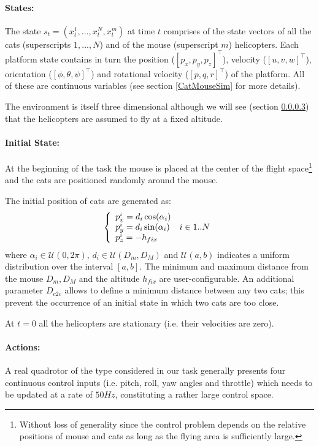 \documentclass[a4paper,11pt]{report}
\begin{document}
\paragraph{States:} The state $s_t = (x^1_t,...,x^{N}_t,x^m_t)$ at time $t$ comprises of the state vectors of all the cats (superscripts $1,...,N$) and of the mouse (superscript $m$) helicopters. 
Each platform state contains in turn the position ($[p_x,p_y,p_z]^\intercal$), velocity ($[u,v,w]^\intercal$), orientation ($[\phi,\theta,\psi]^\intercal$) and rotational velocity ($[p,q,r]^\intercal$) of the platform. All of these are continuous variables (see section \ref{CatMouseSim} for more details).

The environment is itself three dimensional although we will see (section \ref{catmouseactions}) that the helicopters are assumed to fly at a fixed altitude.

\paragraph{Initial State:} At the beginning of the task the mouse is placed at the center of the flight space\footnote{Without loss of generality since the control problem depends on the relative positions of mouse and cats as long as the flying area is sufficiently large.} and the cats are positioned randomly around the mouse.

The initial position of cats are generated as:
$$
\left\{
\begin{array}{l l}
p^i_x =  d_i \cos(\alpha_i) & \\
p^i_y =  d_i \sin(\alpha_i) & i \in 1..N\\
p^i_z = - h_{fix} & \\
\end{array}
\right.
$$
where $\alpha_i \in \mathcal{U}(0,2\pi)$, $d_i \in \mathcal{U}(D_m,D_M)$ and $\mathcal{U}(a,b)$ indicates a uniform distribution over the interval $[a,b]$. The minimum and maximum distance from the mouse $D_m,D_M$ and the altitude $h_{fix}$ are user-configurable.
An additional parameter $D_{c2c}$ allows to define a minimum distance between any two cats; this prevent the occurrence of an initial state in which two cats are too close.

At $t=0$ all the helicopters are stationary (i.e. their velocities are zero).

\paragraph{Actions:}\label{catmouseactions} 
A real quadrotor of the type considered in our task generally presents four continuous control inputs (i.e. pitch, roll, yaw angles and throttle) which needs to be updated at a rate of $50Hz$, constituting a rather large control space.
\end{document}
